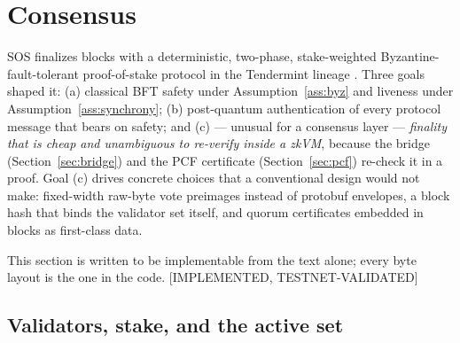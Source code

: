 \documentclass[11pt]{article}
\newcommand{\statusV}{\textcolor{statgreen}{\textsf{\scriptsize[IMPLEMENTED, TESTNET-VALIDATED]}}}
\theoremstyle{plain}
\theoremstyle{definition}
\theoremstyle{remark}
\begin{document}
\section{Consensus}
\label{sec:consensus}

SOS finalizes blocks with a deterministic, two-phase, stake-weighted
Byzantine-fault-tolerant proof-of-stake protocol in the Tendermint lineage
\cite{tendermint2016,tendermint2018,pbft1999}. Three goals shaped it:
(a) classical BFT safety under Assumption~\ref{ass:byz} and liveness under
Assumption~\ref{ass:synchrony}; (b) post-quantum authentication of every
protocol message that bears on safety; and (c) --- unusual for a consensus
layer --- \emph{finality that is cheap and unambiguous to re-verify inside a
zkVM}, because the bridge (Section~\ref{sec:bridge}) and the PCF certificate
(Section~\ref{sec:pcf}) re-check it in a proof. Goal (c) drives concrete
choices that a conventional design would not make: fixed-width raw-byte vote
preimages instead of protobuf envelopes, a block hash that binds the validator
set itself, and quorum certificates embedded in blocks as first-class data.

This section is written to be implementable from the text alone; every byte
layout is the one in the code. \statusV{}

\subsection{Validators, stake, and the active set}
\label{sec:valset}
\end{document}
